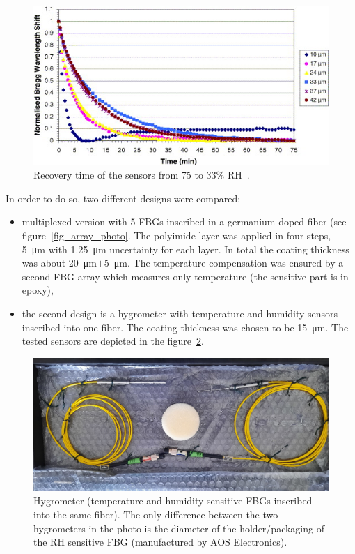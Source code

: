 \begin{figure}[!h]
\centering
\includegraphics[width=0.75\columnwidth]{Chapter5/images/time_response_yeo.jpg}
\caption{Recovery time of the sensors from 75 to 33\% RH~\cite{YEO_PI}.}
\label{fig:yeo2}
\end{figure}

In order to do so, two different designs were compared:
\begin{itemize}
    \item multiplexed version with 5 \glspl{FBG} inscribed in a germanium-doped fiber (see figure~\ref{fig_array_photo}. The polyimide layer was applied in four steps, \SI{5}{\micro\metre} with \SI{1.25}{\micro\metre} uncertainty for each layer. In total the coating thickness was about \SI{20}{\micro\metre}$\pm$\SI{5}{\micro\metre}. The temperature compensation was ensured by a second \gls{FBG} array which measures only temperature (the sensitive part is in epoxy),
    \item the second design is a hygrometer with temperature and humidity sensors inscribed into one fiber. The coating thickness was chosen to be \SI{15}{\micro\metre}. The tested sensors are depicted in the figure~\ref{fig_single_photo}.
\end{itemize}

\begin{figure}[!h]
\centering
\includegraphics[width=0.75\columnwidth]{Chapter5/images/single1.jpeg}
\caption{Hygrometer (temperature and humidity sensitive \glspl{FBG} inscribed into the same fiber). The only difference between the two hygrometers in the photo is the diameter of the holder/packaging of the \gls{RH} sensitive \gls{FBG} (manufactured by AOS Electronics).}
\label{fig_single_photo}
\end{figure}

